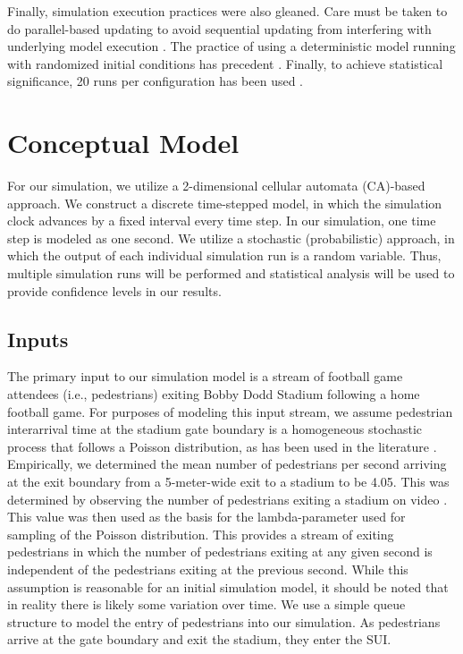 \documentclass[12pt]{article}
\begin{document}
Finally, simulation execution practices were also gleaned. Care must be taken
to do parallel-based updating to avoid sequential updating from interfering with
underlying model execution \cite{blue2001cellular}. The practice of using
a deterministic model running with randomized initial conditions has precedent
\cite{biham1992self}. Finally, to achieve statistical significance, 20 runs per
configuration has been used \cite{blue2001cellular}.

\section{Conceptual Model}
For our simulation, we utilize a 2-dimensional cellular automata (CA)-based
approach. We construct a discrete time-stepped model, in which the simulation
clock advances by a fixed interval every time step. In our simulation, one time
step is modeled as one second. We utilize a stochastic
(probabilistic) approach, in which the output of each individual simulation
run is a random variable. Thus, multiple simulation runs will be performed and
statistical analysis will be used to provide confidence levels in our results.

\subsection{Inputs}
The primary input to our simulation model is a stream of football game attendees
(i.e., pedestrians) exiting Bobby Dodd Stadium following a home football game.
For purposes of modeling this input stream, we assume pedestrian interarrival
time at the stadium gate boundary is a homogeneous stochastic process that
follows a Poisson distribution, as has been used in the literature
\cite{rahman2013modelling}. Empirically, we determined the mean number of
pedestrians per second arriving at the exit boundary from a 5-meter-wide exit to
a stadium to be 4.05. This was determined by observing the number of pedestrians
exiting a stadium on video \cite{youtubestadium}. This value was then used as
the basis for the lambda-parameter used for sampling of the Poisson
distribution. This provides a stream of exiting pedestrians in which the number
of pedestrians exiting at any given second is independent of the pedestrians
exiting at the previous second. While this assumption is reasonable for an
initial simulation model, it should be noted that in reality there is likely
some variation over time. We use a simple queue structure to model the entry of
pedestrians into our simulation. As pedestrians arrive at the gate boundary and
exit the stadium, they enter the SUI.
\end{document}
